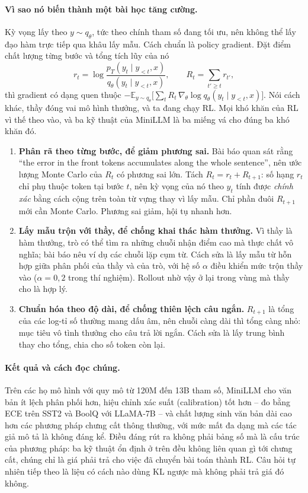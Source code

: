 \paragraph{Vì sao nó biến thành một bài học tăng cường.} Kỳ vọng lấy theo $y\sim q_\theta$, tức theo chính tham số đang tối ưu, nên không thể lấy đạo hàm trực tiếp qua khâu lấy mẫu. Cách chuẩn là policy gradient. Đặt điểm chất lượng từng bước và tổng tích lũy của nó
\[
r_t = \log\frac{p_T(y_t\mid y_{<t},x)}{q_\theta(y_t\mid y_{<t},x)},
\qquad
R_t = \sum_{t'\ge t} r_{t'},
\]
thì gradient có dạng quen thuộc $-\mathbb{E}_{y\sim q_\theta}\big[\sum_t R_t\,\nabla_\theta \log q_\theta(y_t\mid y_{<t},x)\big]$. Nói cách khác, thầy đóng vai mô hình thưởng, và ta đang chạy RL. Mọi khó khăn của RL vì thế theo vào, và ba kỹ thuật của MiniLLM là ba miếng vá cho đúng ba khó khăn đó.

\begin{enumerate}
	\item \textbf{Phân rã theo từng bước, để giảm phương sai.} Bài báo quan sát rằng ``the error in the front tokens accumulates along the whole sentence'', nên ước lượng Monte Carlo của $R_t$ có phương sai lớn. Tách $R_t = r_t + R_{t+1}$: số hạng $r_t$ chỉ phụ thuộc token tại bước $t$, nên kỳ vọng của nó theo $y_t$ tính được \emph{chính xác} bằng cách cộng trên toàn từ vựng thay vì lấy mẫu. Chỉ phần đuôi $R_{t+1}$ mới cần Monte Carlo. Phương sai giảm, hội tụ nhanh hơn.
	\item \textbf{Lấy mẫu trộn với thầy, để chống khai thác hàm thưởng.} Vì thầy là hàm thưởng, trò có thể tìm ra những chuỗi nhận điểm cao mà thực chất vô nghĩa; bài báo nêu ví dụ các chuỗi lặp cụm từ. Cách sửa là lấy mẫu từ hỗn hợp giữa phân phối của thầy và của trò, với hệ số $\alpha$ điều khiển mức trộn thầy vào ($\alpha = 0{,}2$ trong thí nghiệm). Rollout nhờ vậy ở lại trong vùng mà thầy cho là hợp lý.
	\item \textbf{Chuẩn hóa theo độ dài, để chống thiên lệch câu ngắn.} $R_{t+1}$ là tổng của các log-tỉ số thường mang dấu âm, nên chuỗi càng dài thì tổng càng nhỏ: mục tiêu vô tình thưởng cho câu trả lời ngắn. Cách sửa là lấy trung bình thay cho tổng, chia cho số token còn lại.
\end{enumerate}

\paragraph{Kết quả và cách đọc chúng.} Trên các họ mô hình với quy mô từ 120M đến 13B tham số, MiniLLM cho văn bản ít lệch phân phối hơn, hiệu chỉnh xác suất (calibration) tốt hơn -- đo bằng ECE trên SST2 và BoolQ với LLaMA-7B -- và chất lượng sinh văn bản dài cao hơn các phương pháp chưng cất thông thường, với mức mất đa dạng mà các tác giả mô tả là không đáng kể. Điều đáng rút ra không phải bảng số mà là cấu trúc của phương pháp: ba kỹ thuật ổn định ở trên đều không liên quan gì tới chưng cất, chúng chỉ là giá phải trả cho việc đã chuyển bài toán thành RL. Câu hỏi tự nhiên tiếp theo là liệu có cách nào dùng KL ngược mà không phải trả giá đó không.

